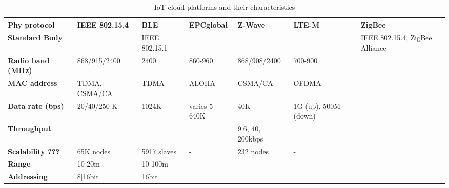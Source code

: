 \begin{table}[h!]
\scriptsize
	\begin{tabulary}{\textwidth}{L|L|L|L|L|L|L}
	\bf{Phy protocol}     & \bf{IEEE 802.15.4} & \bf{BLE}      & \bf{EPCglobal} & \bf{Z-Wave}              & \bf{LTE-M}           & \bf{ZigBee} \\\hline
	\bf{Standard Body}    &                    & IEEE 802.15.1 &                &                          &                      & IEEE 802.15.4, ZigBee Alliance \\\hline
	\bf{Radio band (MHz)} & 868/915/2400       & 2400          & 860-960        & 868/908/2400             & 700-900              & \\\hline
	\bf{MAC address}      & TDMA, CSMA/CA      & TDMA          & ALOHA          & CSMA/CA                  & OFDMA                & \\\hline
	\bf{Data rate (bps)}  & 20/40/250 K        & 1024K         & varies 5-640K  & 40K                      & 1G (up), 500M (down) & \\\hline
	\bf{Throughput}       &                    &               &                & 9.6, 40, 200kbps         &                      & \\\hline
	\bf{Scalability ???}  & 65K nodes          & 5917 slaves   & -              & 232 nodes                & -                    & \\\hline
	\bf{Range}            & 10-20m             & 10-100m       &                &                          &                      & \\\hline
	\bf{Addressing}       & 8|16bit            & 16bit         &                &                          &                      & \\\hline
	\end{tabulary}
	\caption{\label{tab:IoT_cloud} IoT cloud platforms and their characteristics \cite{al-fuqaha_internet_24}}
\end{table}


